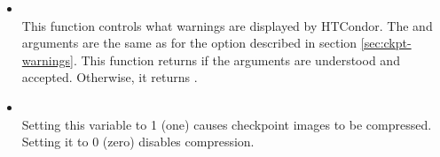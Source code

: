 \begin{itemize}
\item {}\\
This function controls what warnings are displayed by HTCondor.
The  and  arguments are the same as for the
 option described in section \ref{sec:ckpt-warnings}.  This function returns 
if the arguments are understood and accepted.  
Otherwise, it returns .

\item {}\\
Setting this variable to 1 (one) causes checkpoint images to be compressed.
Setting it to 0 (zero) disables compression.

\end{itemize}

